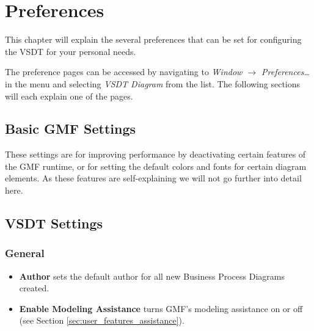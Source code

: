 \chapter{Preferences}
\label{sec:user_preferences}

This chapter will explain the several preferences that can be set for configuring
the VSDT for your personal needs.

The preference pages can be accessed by navigating to \emph{Window $\rightarrow$
Preferences\dots} in the menu and selecting \emph{VSDT Diagram} from the list.
The following sections will each explain one of the pages.


\section{Basic GMF Settings}
\label{sec:user_preferences_gmf}

These settings are for improving performance by deactivating certain features of
the GMF runtime, or for setting the default colors and fonts for certain diagram
elements.  As these features are self-explaining we will not go further into
detail here.


\section{VSDT Settings}
\label{sec:user_preferences_vsdt}

\subsection{General}
\begin{itemize}
	\item \textbf{Author} sets the default author for all new Business Process
	Diagrams created.
	
	\item \textbf{Enable Modeling Assistance} turns GMF's modeling assistance on
	or off (see Section \ref{sec:user_features_assistance}).
\end{itemize}	

